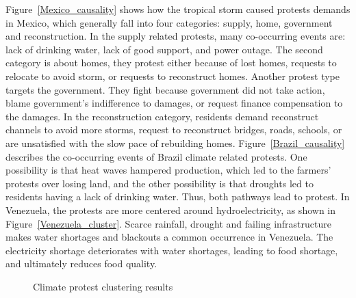 \documentclass[9pt,twocolumn,twoside]{pnas-new}
\begin{document}
Figure~\ref{Mexico_causality} shows how the tropical storm caused protests demands in Mexico, which generally fall into four categories: supply, home, government and reconstruction. In the supply related protests, many co-occurring events are: lack of drinking water, lack of good support, and power outage. The second category is about homes, they protest either because of lost homes, requests to relocate to avoid storm, or requests to reconstruct homes. Another protest type targets the government.
They fight because government did not take action, blame government's indifference to damages, or request finance compensation to the damages.
In the reconstruction category, residents demand reconstruct channels to avoid more storms, request to reconstruct bridges, roads, schools, or are unsatisfied with the slow pace of rebuilding homes. Figure~\ref{Brazil_causality} describes the co-occurring events of Brazil climate related protests. One possibility is that heat waves hampered production, which led to the farmers' protests over losing land, and the other possibility is that droughts led to residents having a lack of drinking water.
Thus, both pathways lead to protest.
In Venezuela, the protests are more centered around hydroelectricity, as shown in Figure~\ref{Venezuela_cluster}. Scarce rainfall, drought and failing infrastructure makes water shortages and blackouts a common occurrence in Venezuela. The electricity shortage deteriorates with water shortages, leading to food shortage, and ultimately reduces food quality.


\begin{figure}[ht]
	\centering
	\caption{Climate protest clustering results}
\label{clusters}
\end{figure}
\end{document}
